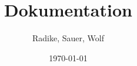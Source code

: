 \documentclass[a4paper,12pt]{article}
\begin{document}
\title{Dokumentation}
\author{Radike, Sauer, Wolf}
\date{\today}
\maketitle


\end{document}
